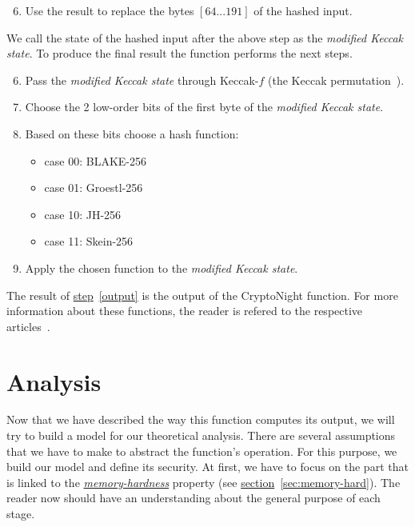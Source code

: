 \begin{enumerate}
  \setcounter{enumi}{5}
  \item \label{modified} Use the result to replace the bytes $[64...191]$ of the hashed input.
\end{enumerate}
We call the state of the hashed input after the above step as the \emph{modified Keccak state}. To produce the final result the function performs the next steps.

\begin{enumerate}
  \setcounter{enumi}{5}
  \item Pass the \emph{modified Keccak state} through Keccak-$f$ (the Keccak permutation~\cite{keccak}).
  \item Choose the 2 low-order bits of the first byte of the \emph{modified Keccak state}.
  \item Based on these bits choose a hash function:
  \begin{itemize}
    \item case 00: BLAKE-256
    \item case 01: Groestl-256
    \item case 10: JH-256
    \item case 11: Skein-256
  \end{itemize}
  \item \label{output} Apply the chosen function to the \emph{modified Keccak state}.
\end{enumerate}
The result of \hyperref[output]{step}~\ref{output} is the output of the CryptoNight function. For more information about these functions, the reader is refered to the respective articles~\cite{10030667226,sha3groestl,sha3W09,sha3F+08}.

\section{Analysis} \label{sec:analysis}
Now that we have described the way this function computes its output, we will try to build a model for our theoretical analysis. There are several assumptions that we have to make to abstract the function's operation. For this purpose, we build our model and define its security. At first, we have to focus on the part that is linked to the \hyperref[sec:memory-hard]{\emph{memory-hardness}} property (see \hyperref[sec:memory-hard]{section}~\ref{sec:memory-hard}). The reader now should have an understanding about the general purpose of each stage.

